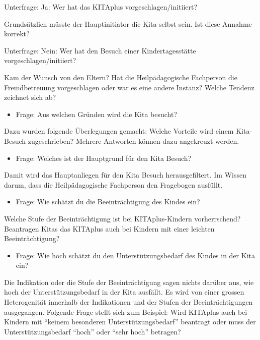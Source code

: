 \documentclass[
  ngerman,
  11pt,
  paper=a4,
  twoside,
  titlepage=true,
  openright,
  abstract=on,
  toc=listofnumbered,
  numbers=noenddot,
  chapterprefix=true,
  headings=optiontohead,
  svgnames,
  dvipsnames]{scrreprt}
\providecommand{\tightlist}{%
  \setlength{\itemsep}{0pt}\setlength{\parskip}{0pt}}
\begin{document}
Unterfrage: Ja: Wer hat das KITAplus vorgeschlagen/initiiert?

Grundsätzlich müsste der Hauptinitiator die Kita selbst sein. Ist diese
Annahme korrekt?

Unterfrage: Nein: Wer hat den Besuch einer Kindertagesstätte
vorgeschlagen/initiiert?

Kam der Wunsch von den Eltern? Hat die Heilpädagogische Fachperson die
Fremdbetreuung vorgeschlagen oder war es eine andere Instanz? Welche
Tendenz zeichnet sich ab?

\begin{itemize}
\tightlist
\item
  Frage: Aus welchen Gründen wird die Kita besucht?
\end{itemize}

Dazu wurden folgende Überlegungen gemacht: Welche Vorteile wird einem
Kita-Besuch zugeschrieben? Mehrere Antworten können dazu angekreuzt
werden.

\begin{itemize}
\tightlist
\item
  Frage: Welches ist der Hauptgrund für den Kita Besuch?
\end{itemize}

Damit wird das Hauptanliegen für den Kita Besuch herausgefiltert. Im
Wissen darum, dass die Heilpädagogische Fachperson den Fragebogen
ausfüllt.

\begin{itemize}
\tightlist
\item
  Frage: Wie schätzt du die Beeinträchtigung des Kindes ein?
\end{itemize}

Welche Stufe der Beeinträchtigung ist bei KITAplus-Kindern
vorherrschend? Beantragen Kitas das KITAplus auch bei Kindern mit einer
leichten Beeinträchtigung?

\begin{itemize}
\tightlist
\item
  Frage: Wie hoch schätzt du den Unterstützungsbedarf des Kindes in der
  Kita ein?
\end{itemize}

Die Indikation oder die Stufe der Beeinträchtigung sagen nichts darüber
aus, wie hoch der Unterstützungsbedarf in der Kita ausfällt. Es wird von
einer grossen Heterogenität innerhalb der Indikationen und der Stufen
der Beeinträchtigungen ausgegangen. Folgende Frage stellt sich zum
Beispiel: Wird KITAplus auch bei Kindern mit “keinem besonderen
Unterstützungsbedarf” beantragt oder muss der Unterstützungsbedarf
“hoch” oder “sehr hoch” betragen?
\end{document}
